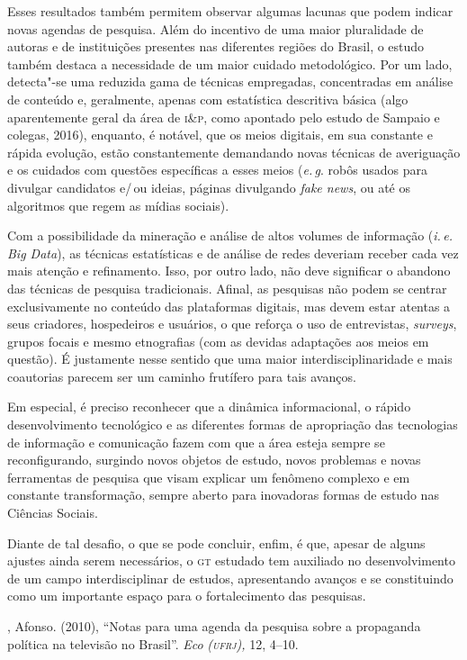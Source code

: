 {Esses resultados também permitem observar algumas lacunas que podem
indicar novas agendas de pesquisa. Além do incentivo de uma maior
pluralidade de autoras e de instituições presentes nas diferentes
regiões do Brasil, o estudo também destaca a necessidade de um maior
cuidado metodológico. Por um lado, detecta"-se uma reduzida gama de
técnicas empregadas, concentradas em análise de conteúdo e, geralmente,
apenas com estatística descritiva básica (algo aparentemente geral da
área de \textsc{i\&p}, como apontado pelo estudo de Sampaio e colegas, 2016),
enquanto, é notável, que os meios digitais, em sua constante e rápida
evolução, estão constantemente demandando novas técnicas de averiguação
e os cuidados com questões específicas a esses meios (\textit{e.\,g}. robôs usados
para divulgar candidatos e/\,ou ideias, páginas divulgando \textit{fake
news}, ou até os algoritmos que regem as mídias sociais).

Com a possibilidade da mineração e análise de altos volumes de
informação (\textit{i.\,e.} \textit{Big Data}), as técnicas estatísticas e de análise de
redes deveriam receber cada vez mais atenção e refinamento. Isso, por
outro lado, não deve significar o abandono das técnicas de pesquisa
tradicionais. Afinal, as pesquisas não podem se centrar exclusivamente
no conteúdo das plataformas digitais, mas devem estar atentas a seus
criadores, hospedeiros e usuários, o que reforça o uso de entrevistas,
\textit{surveys}, grupos focais e mesmo etnografias (com as devidas
adaptações aos meios em questão). É justamente nesse sentido que uma
maior interdisciplinaridade e mais coautorias parecem ser um caminho
frutífero para tais avanços.

Em especial, é preciso reconhecer que a dinâmica informacional, o rápido
desenvolvimento tecnológico e as diferentes formas de apropriação das
tecnologias de informação e comunicação fazem com que a área esteja
sempre se reconfigurando, surgindo novos objetos de estudo, novos
problemas e novas ferramentas de pesquisa que visam explicar um fenômeno
complexo e em constante transformação, sempre aberto para inovadoras
formas de estudo nas Ciências Sociais.

Diante de tal desafio, o que se pode concluir, enfim, é que, apesar de
alguns ajustes ainda serem necessários, o \textsc{gt} estudado tem auxiliado no
desenvolvimento de um campo interdisciplinar de estudos, apresentando
avanços e se constituindo como um importante espaço para o
fortalecimento das pesquisas.

\begin{bibliohedra}
, Afonso. (2010), ``Notas para uma agenda da pesquisa sobre a
propaganda política na televisão no Brasil''. \textit{Eco} \textit{(\textsc{ufrj}),}
12, 4--10.


\end{bibliohedra}}
